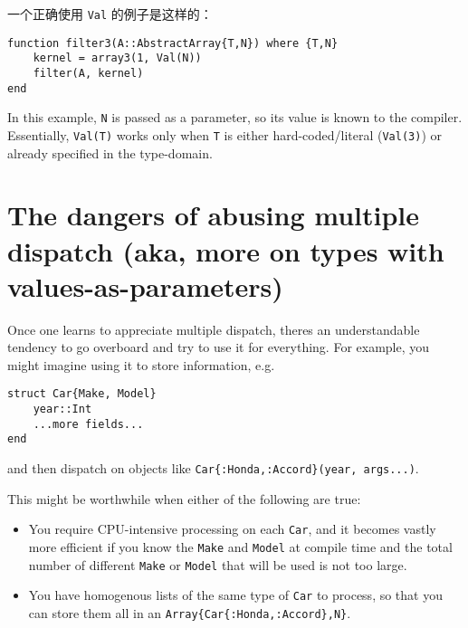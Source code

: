 一个正确使用 \texttt{Val} 的例子是这样的：




\begin{verbatim}
function filter3(A::AbstractArray{T,N}) where {T,N}
    kernel = array3(1, Val(N))
    filter(A, kernel)
end
\end{verbatim}



In this example, \texttt{N} is passed as a parameter, so its {\textquotedbl}value{\textquotedbl} is known to the compiler. Essentially, \texttt{Val(T)} works only when \texttt{T} is either hard-coded/literal (\texttt{Val(3)}) or already specified in the type-domain.



\hypertarget{5410118045861360063}{}


\section{The dangers of abusing multiple dispatch (aka, more on types with values-as-parameters)}



Once one learns to appreciate multiple dispatch, there{\textquotesingle}s an understandable tendency to go overboard and try to use it for everything. For example, you might imagine using it to store information, e.g.




\begin{lstlisting}
struct Car{Make, Model}
    year::Int
    ...more fields...
end
\end{lstlisting}



and then dispatch on objects like \texttt{Car\{:Honda,:Accord\}(year, args...)}.



This might be worthwhile when either of the following are true:



\begin{itemize}
\item You require CPU-intensive processing on each \texttt{Car}, and it becomes vastly more efficient if you know the \texttt{Make} and \texttt{Model} at compile time and the total number of different \texttt{Make} or \texttt{Model} that will be used is not too large.


\item You have homogenous lists of the same type of \texttt{Car} to process, so that you can store them all in an \texttt{Array\{Car\{:Honda,:Accord\},N\}}.

\end{itemize}


